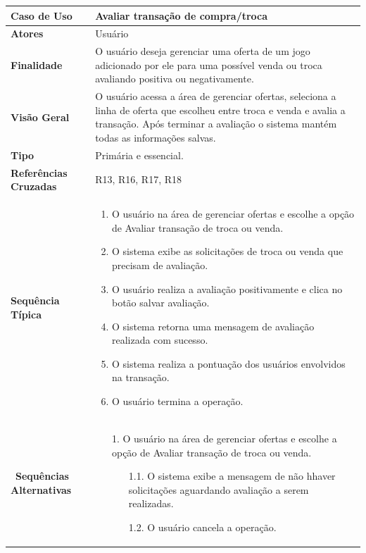 \documentclass[a4paper,11pt]{article}
\begin{document}
\begin{table}[H]
		\begin{tabularx}{\textwidth}{|l|X|}
		\hline
			\textbf{Caso de Uso} &  Avaliar transação de compra/troca \\ \hline
			\textbf{Atores} &  Usuário  \\ \hline
			\textbf{Finalidade} &  O usuário deseja gerenciar uma oferta de um jogo adicionado por ele para uma possível venda ou troca avaliando positiva ou negativamente. \\ \hline
			\textbf{Visão Geral} & O usuário acessa a área de gerenciar ofertas, seleciona a linha de oferta que escolheu entre troca e venda e avalia a transação. Após terminar a avaliação o sistema mantém todas as informações salvas. \\ \hline
			\textbf{Tipo} &  Primária e essencial. \\ \hline
			\textbf{Referências Cruzadas} & R13, R16, R17, R18 \\ \hline
			\textbf{Sequência Típica} & 
			\begin{enumerate}
			\item O usuário na área de gerenciar ofertas e escolhe a opção de Avaliar transação de troca ou venda.
			\item O sistema exibe as solicitações de troca ou venda que precisam de avaliação.
			\item O usuário realiza a avaliação positivamente e clica no botão salvar avaliação.
			\item O sistema retorna uma mensagem de avaliação realizada com sucesso.
			\item O sistema realiza a pontuação dos usuários envolvidos na transação.
			\item O usuário termina a operação. 
			\end{enumerate} \\ \hline
			\
			\textbf{Sequências Alternativas} & 
			\begin{itemize}
				\item[1.] O usuário na área de gerenciar ofertas e escolhe a opção de Avaliar transação de troca ou venda.
				\begin{itemize}
					\item[1.1.] O sistema exibe a mensagem de não hhaver solicitações aguardando avaliação a serem realizadas.
					\item[1.2.] O usuário cancela a operação.
				\end{itemize}
				
			\end{itemize} \\ \hline
		\end{tabularx}
\end{table}
\end{document}

